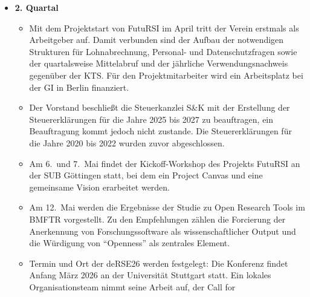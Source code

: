 \begin{itemize}
\begin{itemize}
       (\href{https://ror.org/007qpef44}{ROR: 007qpef44}) und kann damit in Publikationen eindeutig
       als Affiliation angegeben werden.
     \item Der Vorstand beschließt eine Datenschutzordnung mit Vertraulichkeitsverpflichtung,
       Datenschutzinformation und Datenschutzrichtlinie und bestellt Michael Meinel zum Datenschutzbeauftragten.
     \item Nach Abschluss der Review-Phase bestätigt der Vorstand das
       \href{https://github.com/DE-RSE/2023_paper-RSE-groups}{Papier \glqq Establishing RSE departments in
       German research institutions\grqq} als offizielles Positionspapier des Vereins.
     \item Der Vorstand unterstützt die Zusammenführung der weitgehend inhaltsgleichen Mailinglisten
       des Vereins und der Fachgruppe RSE der GI.
   \end{itemize}\clearpage
 \item[] \textbf{2. Quartal}
   \begin{itemize}
    \item Mit dem Projektstart von FutuRSI im April tritt der Verein erstmals als Arbeitgeber auf.
      Damit verbunden sind der Aufbau der notwendigen Strukturen für Lohnabrechnung, Personal- und
      Datenschutzfragen sowie der quartalsweise Mittelabruf und der jährliche Verwendungsnachweis
      gegenüber der KTS. Für den Projektmitarbeiter wird ein Arbeitsplatz bei der GI in Berlin
      finanziert.
    \item Der Vorstand beschließt die Steuerkanzlei S\&K mit der Erstellung der Steuererklärungen für
      die Jahre 2025 bis 2027 zu beauftragen, ein Beauftragung kommt jedoch nicht zustande. Die
      Steuererklärungen für die Jahre 2020 bis 2022 wurden zuvor abgeschlossen.
    \item Am 6.\ und 7.~Mai findet der Kickoff-Workshop des Projekts FutuRSI an der SUB Göttingen
      statt, bei dem ein Project Canvas und eine gemeinsame Vision erarbeitet werden.
    \item Am 12.~Mai werden die Ergebnisse der Studie zu Open Research Tools im BMFTR vorgestellt.
      Zu den Empfehlungen zählen die Forcierung der Anerkennung von Forschungssoftware als
      wissenschaftlicher Output und die Würdigung von "`Openness"' als zentrales Element.
    \item Termin und Ort der deRSE26 werden festgelegt: Die Konferenz findet Anfang März 2026 an der
      Universität Stuttgart statt. Ein lokales Organisationsteam nimmt seine Arbeit auf, der Call for

\end{itemize}
\end{itemize}
